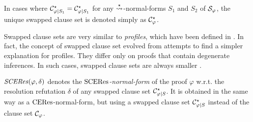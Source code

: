 \begin{remark}
In cases where $\mathcal{C}^{\star}_{\varphi|S_1} = \mathcal{C}^{\star}_{\varphi|S_1}$ for any $\stackrel{\star}{\leadsto}$-normal-forms $S_1$ and $S_2$ of $\mathcal{S}_{\varphi}$, the unique swapped clause set is denoted simply as $\mathcal{C}^{\star}_{\varphi}$.
\end{remark}


\begin{remark}
Swapped clause sets are very similar to \emph{profiles}, which have been defined in \cite{Hetzl2007CharacteristicClauseSetsandProofTransformations}. In fact, the concept of swapped clause set evolved from attempts to find a simpler explanation for profiles. They differ only on proofs that contain  degenerate inferences. In such cases, swapped clause sets are always smaller \cite{Woltzenlogel-Paleo2009A-General-Analysis-of-Cut-Elimination-by-CERes}.
\end{remark}


\begin{definition}
$\mathit{SCERes}(\varphi,\delta)$ denotes the \emph{$\mathrm{SCERes}$-normal-form} of the proof $\varphi$ w.r.t. the resolution refutation $\delta$ of any swapped clause set $\mathcal{C}^{\star}_{\varphi|S}$. It is obtained in the same way as a $\mathrm{CERes}$-normal-form, but using a swapped clause set $\mathcal{C}^{\star}_{\varphi|S}$ instead of the clause set $\mathcal{C}_{\varphi}$.
\end{definition}


